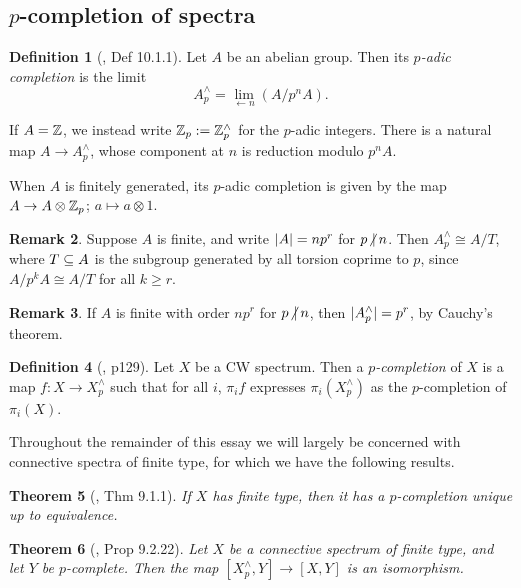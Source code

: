 \documentclass[11pt, titlepage]{article} %
\def\subq{\ensuremath\subseteq}
\def\inte{\ensuremath\mathbb{Z}}
\def\nvert{\ensuremath\hspace{-0.5ex}\not\vert\hspace{0.5ex}}
\numberwithin{equation}{subsection}
\theoremstyle{plain}
\newtheorem{theorem}{Theorem}[subsection]
\theoremstyle{definition}
\newtheorem{definition}[theorem]{Definition}
\newtheorem{remark}[theorem]{Remark}
\begin{document}
\subsection{\(p\)-completion of spectra}\label{2504291246}

\begin{definition}[{\autocite{concise}, Def 10.1.1}]
Let \(A\) be an abelian group. Then its \textit{\(p\)-adic completion} is the limit 
\[A^\wedge_p=\lim\limits_{\leftarrow n} (A/p^nA).\]
\end{definition}

If \(A=\inte\), we instead write \(\inte_p:= \inte^\wedge_p\) for the \(p\)-adic integers. There is a natural map \(A \to A^\wedge_p\), whose component at \(n\) is reduction modulo \(p^nA\). 

When \(A\) is finitely generated, its \(p\)-adic completion is given by the map \(A \to A\otimes \inte_p\); \(a\mapsto a\otimes 1\). 


\begin{remark}%
Suppose \(A\) is finite, and write \(\lvert A\rvert=np^r\) for \(p\nvert n\). Then \(A^\wedge_p\cong A/T\), where \(T\subq A\) is the subgroup generated by all torsion coprime to \(p\), since \(A/p^kA\cong A/T\) for all \(k\geq r\).
\end{remark}

\begin{remark}
If \(A\) is finite with order \(np^r\) for \(p\nvert n\), then \(\lvert A^\wedge_p\rvert=p^r\), by Cauchy's theorem. 
\end{remark}

\begin{definition}[{\autocite{spectra}, p129}]
Let \(X\) be a CW spectrum. Then a \textit{\(p\)-completion} of \(X\) is a map \(f : X \to X^\wedge_p\) such that for all \(i\), \(\pi_if\) expresses \(\pi_i(X^\wedge_p)\) as the \(p\)-completion of \(\pi_i(X)\).
\end{definition}

Throughout the remainder of this essay we will largely be concerned with connective spectra of finite type, for which we have the following results.

\begin{theorem}[{\autocite{spectra}, Thm 9.1.1}]
If \(X\) has finite type, then it has a \(p\)-completion unique up to equivalence. 
\end{theorem}

\begin{theorem}[{\autocite{spectra}, Prop 9.2.22}]\label{2504180925}
Let \(X\) be a connective spectrum of finite type, and let \(Y\) be \(p\)-complete. Then the map \([X^\wedge_p, Y]\to [X, Y]\) is an isomorphism.
\end{theorem}
\end{document}
